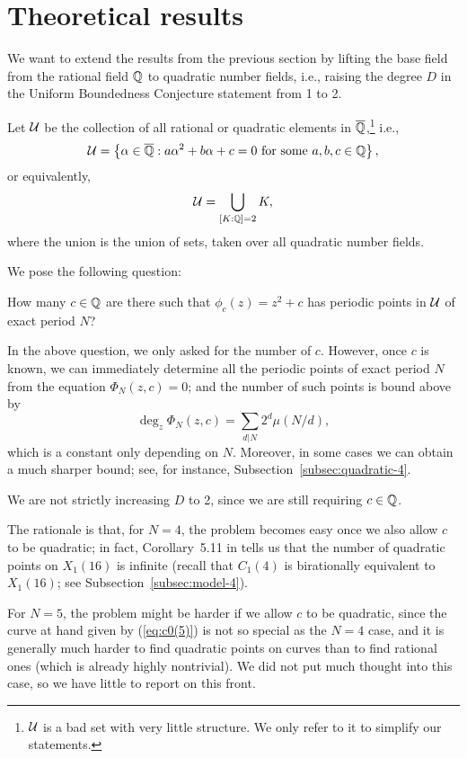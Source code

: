 \section{Theoretical results}
\label{sec:th}

We want to extend the results from the previous section by lifting the
base field from the rational field $\mathbb{Q}$ to quadratic number fields,
i.e., raising the degree $D$ in the Uniform Boundedness Conjecture
statement from 1 to 2.

Let $\mathcal{U}$ be the collection of all rational or quadratic elements in
$\overline{\mathbb{Q}}$,\footnote{%
  $\mathcal{U}$ is a bad set with very little structure. We only refer to it to
  simplify our statements.}  i.e.,
\[
\mathcal{U} = \left\{\alpha \in \overline{\mathbb{Q}}: \text{$a \alpha^2 + b \alpha + c = 0$
    for some $a, b, c \in \mathbb{Q}$}\right\},
\]
or equivalently,
\[
\mathcal{U} = \bigcup_{[K : \mathbb{Q}] = 2}K,
\]
where the union is the union of sets, taken over all quadratic number
fields.

We pose the following question:

\begin{question}
  \label{question}
  How many $c \in \mathbb{Q}$ are there such that $\phi_c(z) = z^2 + c$ has
  periodic points in $\mathcal{U}$ of exact period $N$?
\end{question}

\begin{remark}
  In the above question, we only asked for the number of $c$. However,
  once $c$ is known, we can immediately determine all the periodic
  points of exact period $N$ from the equation $\Phi_N(z, c) = 0$; and
  the number of such points is bound above by
  \[
  \deg_z \Phi_N(z, c) = \sum_{d|N}2^d \mu(N/d),
  \]
  which is a constant only depending on $N$. Moreover,
  in some cases we can obtain a much sharper bound; see, for instance,
  Subsection~\ref{subsec:quadratic-4}.
\end{remark}

\begin{remark}
  We are not strictly increasing $D$ to 2, since we are still
  requiring $c \in \mathbb{Q}$.

  The rationale is that, for $N = 4$, the problem becomes easy once
  we also allow $c$ to be quadratic; in fact, Corollary~5.11 in
  \cite{2013arXiv1308.3267B} tells us that the number of quadratic
  points on $X_1(16)$ is infinite (recall that $C_1(4)$ is
  birationally equivalent to $X_1(16)$; see
  Subsection~\ref{subsec:model-4}).

  For $N = 5$, the problem might be harder if we allow $c$ to be
  quadratic, since the curve at hand given by (\ref{eq:c0(5)}) is not
  so special as the $N = 4$ case, and it is generally much harder to
  find quadratic points on curves than to find rational ones (which is
  already highly nontrivial). We did not put much thought into this
  case, so we have little to report on this front.
\end{remark}


